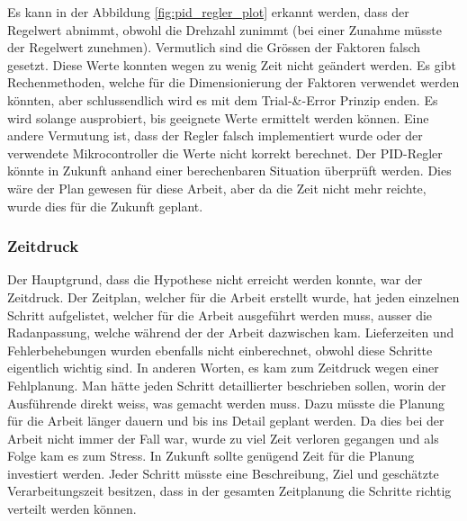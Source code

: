 Es kann in der Abbildung \ref{fig:pid_regler_plot} erkannt werden, dass der Regelwert abnimmt, obwohl die Drehzahl zunimmt (bei einer Zunahme müsste der Regelwert zunehmen). 
\newpara
Vermutlich sind die Grössen der Faktoren falsch gesetzt. Diese Werte konnten wegen zu wenig Zeit nicht geändert werden. Es gibt Rechenmethoden, welche für die Dimensionierung der Faktoren verwendet werden könnten, aber schlussendlich wird es mit dem Trial-\&-Error Prinzip enden. Es wird solange ausprobiert, bis geeignete Werte ermittelt werden können.
\newpara
Eine andere Vermutung ist, dass der Regler falsch implementiert wurde oder der verwendete Mikrocontroller die Werte nicht korrekt berechnet. 
\newpara
Der PID-Regler könnte in Zukunft anhand einer berechenbaren Situation überprüft werden. Dies wäre der Plan gewesen für diese Arbeit, aber da die Zeit nicht mehr reichte, wurde dies für die Zukunft geplant.

\subsubsection{Zeitdruck}
Der Hauptgrund, dass die Hypothese nicht erreicht werden konnte, war der Zeitdruck.
\newpara
Der Zeitplan, welcher für die Arbeit erstellt wurde, hat jeden einzelnen Schritt aufgelistet, welcher für die Arbeit ausgeführt werden muss, ausser die Radanpassung, welche während der der Arbeit dazwischen kam. Lieferzeiten und Fehlerbehebungen wurden ebenfalls nicht einberechnet, obwohl diese Schritte eigentlich wichtig sind.
\newpara
In anderen Worten, es kam zum Zeitdruck wegen einer Fehlplanung. Man hätte jeden Schritt detaillierter beschrieben sollen, worin der Ausführende direkt weiss, was gemacht werden muss. Dazu müsste die Planung für die Arbeit länger dauern und bis ins Detail geplant werden. Da dies bei der Arbeit nicht immer der Fall war, wurde zu viel Zeit verloren gegangen und als Folge kam es zum Stress.
\newpara
In Zukunft sollte genügend Zeit für die Planung investiert werden. Jeder Schritt müsste eine Beschreibung, Ziel und geschätzte Verarbeitungszeit besitzen, dass in der gesamten Zeitplanung die Schritte richtig verteilt werden können.
